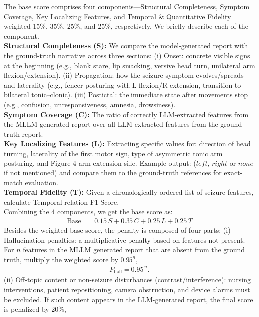 \documentclass{article}
\theoremstyle{plain}
\theoremstyle{definition}
\theoremstyle{remark}
\begin{document}
The base score comprises four components—Structural Completeness, Symptom Coverage, Key Localizing Features, and Temporal \& Quantitative Fidelity weighted 15\%, 35\%, 25\%, and 25\%, respectively. We briefly describe each of the component.
\\
\textbf{Structural Completeness (S):} We compare the model-generated report with the ground-truth narrative across three sections:
(i) Onset: concrete visible signs at the beginning (e.g., blank stare, lip smacking, versive head turn, unilateral arm flexion/extension).
(ii) Propagation: how the seizure symptom evolves/spreads and laterality (e.g., fencer posturing with L flexion/R extension, transition to bilateral tonic–clonic).
(iii) Postictal: the immediate state after movements stop (e.g., confusion, unresponsiveness, amnesia, drowsiness).
\\
\textbf{Symptom Coverage (C):} The ratio of correctly LLM-extracted features from the MLLM generated report over all LLM-extracted features from the ground-truth report.
\\
\textbf{Key Localizing Features (L):} Extracting specific values for: direction of head turning, laterality of the first motor sign, type of asymmetric tonic arm posturing, and Figure-4 arm extension side. Example output: ($left$, $right$ or $none$ if not mentioned) and compare them to the ground-truth references for exact-match evaluation.
\\
\textbf{Temporal Fidelity (T):} Given a chronologically ordered list of seizure features, calculate Temporal-relation F1-Score.
\\
Combining the 4 components, we get the base score as:
\begin{equation}
\begin{aligned}
\text{Base} \;=\; 0.15\,S + 0.35\,C + 0.25\,L + 0.25\,T
\end{aligned}
\end{equation}
Besides the weighted base score, the penalty is composed of four parts: (i) Hallucination penalties: a multiplicative penalty based on features not present. For \(n\) features in the MLLM generated report that are absent from the ground truth, multiply the weighted score by \(0.95^{n}\),
\begin{align}
    P_{\mathrm{hall}}=0.95^{\,n}.
\end{align} (ii) Off-topic content or non-seizure disturbances (contrast/interference): nursing interventions, patient repositioning, camera obstruction, and device alarms must be excluded. If such content appears in the LLM-generated report, the final score is penalized by 20\%,
\end{document}
